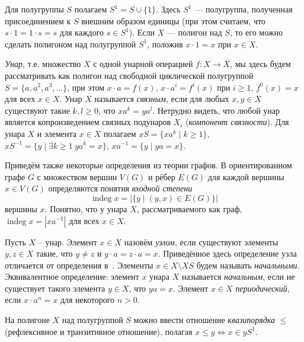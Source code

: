 \documentclass[11pt,twoside,final
]{article}
\def\indeg{\operatorname{indeg}}
\begin{document}
Для полугруппы $S$ полагаем $S^1 = S \cup \{ 1 \}$.
Здесь $S^1$ — полугруппа, полученная присоединением к $S$ внешним образом единицы (при этом считаем, что $s \cdot 1 = 1 \cdot s = s$ для каждого $s \in S^1$).
Если $X$ — полигон над $S$, то его можно сделать полигоном над полугруппой $S^1$, положив $x \cdot 1 = x$ при $x \in X$.

\textit{Унар}, т.е. множество $X$ с одной унарной операцией $f: X \to X$, мы здесь будем рассматривать как полигон над свободной циклической полугруппой $S = \{ a,a^{2},a^{3},\ldots\}$, при этом $x \cdot a = f(x)$, $x \cdot a^i = f^i (x)$ при $i \geqslant 1$, $f^0(x) = x$ для всех $x \in X$.
Унар $X$ называется \textit{связным}, если для любых $x,y \in X$ существуют такие $k,l \geqslant 0$, что $x a^k = y a^l$.
Нетрудно видеть, что любой унар является копроизведением связных подунаров $X_i$ (\textit{компонент связности}).
Для унара $X$ и элемента $x \in X$ полагаем $xS = \{ xa^k \mid k \geqslant 1 \}$, $xS^{-1} = \{ y \mid \exists k \geqslant 1 \ y a^k = x \}$, $xa^{-1} = \{ y \mid ya = x \}$.

Приведём также некоторые определения из теории графов.
В ориентированном графе $G$ с множеством вершин $V(G)$ и рёбер $E(G)$ для каждой вершины $x \in V(G)$ определяются понятия \textit{входной степени}
\[
	\indeg x = |\{ y \mid (y,x) \in E(G) \}|
\]
вершины $x$.
Понятно, что у унара $X$, рассматриваемого как граф, $\indeg x = |xa^{-1}|$ для всех $x \in X$.

Пусть $X$ -- унар.
Элемент $x \in X$ назовём \textit{узлом}, если существуют элементы $y,z \in X$ такие, что $y \neq z$ и $y \cdot a = z \cdot a = x$.
Приведённое здесь определение узла отличается от определения в~\cite{Kozhukhov_8}.
Элементы $x \in X \setminus XS$ будем называть \textit{начальными}.
Эквивалентное определение: элемент $x$ унара $X$ называется \textit{начальным}, если не существует такого элемента $y \in X$, что $ya = x$.
Элемент $x \in X$ \textit{периодический}, если $x \cdot a^n = x$ для некоторого $n > 0$.

На полигоне $X$ над полугруппой $S$ можно ввести отношение \textit{квазипорядка} $\leqslant$ (рефлексивное и транзитивное отношение), полагая $x \leqslant y \Leftrightarrow x \in y S^1$.
\end{document}
